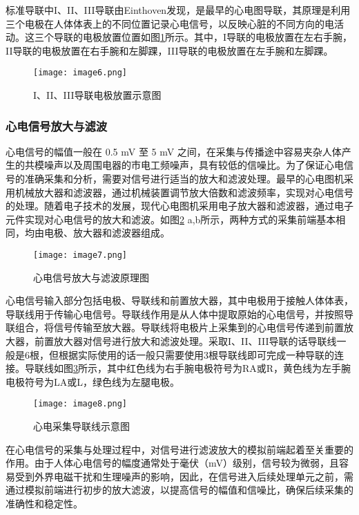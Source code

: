 标准导联中I、II、III导联由Einthoven发现，是最早的心电图导联，其原理是利用三个电极在人体体表上的不同位置记录心电信号，以反映心脏的不同方向的电活动。这三个导联的电极放置位置如图\ref{F.ECG_image6}所示。其中，I导联的电极放置在左右手腕，II导联的电极放置在右手腕和左脚踝，III导联的电极放置在左手腕和左脚踝。

\begin{figure}[hbt]
    \centering
    \texttt{[image: image6.png]}
    \caption{I、II、III导联电极放置示意图\cite{现代医学电子仪器原理与设计}}
    \label{F.ECG_image6}
\end{figure}

\subsubsection{心电信号放大与滤波}

心电信号的幅值一般在 0.5 mV 至 5 mV 之间，在采集与传播途中容易夹杂人体产生的共模噪声以及周围电器的市电工频噪声，具有较低的信噪比。为了保证心电信号的准确采集和分析，需要对信号进行适当的放大和滤波处理。最早的心电图机采用机械放大器和滤波器，通过机械装置调节放大倍数和滤波频率，实现对心电信号的处理。随着电子技术的发展，现代心电图机采用电子放大器和滤波器，通过电子元件实现对心电信号的放大和滤波。如图\ref{F.ECG_image7} a,b所示，两种方式的采集前端基本相同，均由电极、放大器和滤波器组成。

\begin{figure}[htb]
    \centering
    \texttt{[image: image7.png]}
    \caption{心电信号放大与滤波原理图\cite{现代医学电子仪器原理与设计}}
    \label{F.ECG_image7}
\end{figure}

心电信号输入部分包括电极、导联线和前置放大器，其中电极用于接触人体体表，导联线用于传输心电信号。导联线作用是从人体中提取原始的心电信号，并按照导联组合，将信号传输至放大器。导联线将电极片上采集到的心电信号传递到前置放大器，前置放大器对信号进行放大和滤波处理。采取I、II、III导联的话导联线一般是6根，但根据实际使用的话一般只需要使用3根导联线即可完成一种导联的连接。导联线如图\ref{F.ECG_image8}所示，其中红色线为右手腕电极符号为RA或R，黄色线为左手腕电极符号为LA或L，绿色线为左腿电极。

\begin{figure}[hbt]
    \centering
    \texttt{[image: image8.png]}
    \caption{心电采集导联线示意图}
    \label{F.ECG_image8}
\end{figure}

在心电信号的采集与处理过程中，对信号进行滤波放大的模拟前端起着至关重要的作用。由于人体心电信号的幅度通常处于毫伏（mV）级别，信号较为微弱，且容易受到外界电磁干扰和生理噪声的影响，因此，在信号进入后续处理单元之前，需通过模拟前端进行初步的放大滤波，以提高信号的幅值和信噪比，确保后续采集的准确性和稳定性。


